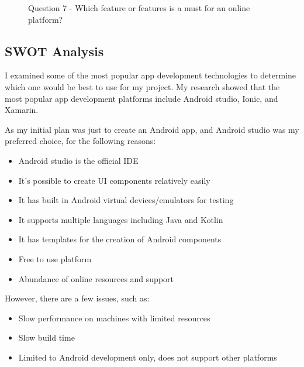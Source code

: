 \begin{figure}[H]
  \centering
  \centering

       \caption{Question 7 - Which feature or features is a must for an online platform?
}
  
\end{figure}


    \subsection{SWOT Analysis}

I examined some of the most popular app development technologies to determine which one would be best to use for my project. My research showed that the most popular app development platforms include Android studio, Ionic, and Xamarin.

As my initial plan was just to create an Android app, and Android studio was my preferred choice, for the following reasons:

\begin{itemize}
    \item  Android studio is the official IDE
    \item It's possible to create UI components relatively easily 
    \item It has built in Android virtual devices/emulators for testing
    \item  It supports multiple languages including Java and Kotlin
    \item It has templates for the creation of Android components
    \item Free to use platform
    \item   Abundance of online resources and support



\end{itemize}

However, there are a few issues, such as:

 \begin{itemize}
    \item    Slow performance on machines with limited resources
    \item Slow build time
    \item Limited to Android development only, does not support other platforms
\end{itemize}

